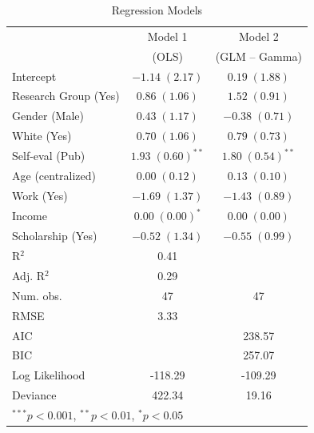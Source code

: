 \documentclass[compress]{beamer}
\begin{document}
\begin{frame}
	\begin{table}
		\centering
		\scriptsize
			\caption{Regression Models}
			\label{linear-coefficients}
		
		\begin{tabular}{l c c }
				\hline
				& Model 1 & Model 2 \\
				& (OLS)   & (GLM -- Gamma) \\
				\hline
				Intercept    & $-1.14 \; (2.17)$     & $0.19 \; (1.88)$      \\
				Research Group (Yes) & $0.86 \; (1.06)$      & $1.52 \; (0.91)$      \\
				Gender (Male)  & $0.43 \; (1.17)$      & $-0.38 \; (0.71)$     \\
				White (Yes)    & $0.70 \; (1.06)$      & $0.79 \; (0.73)$      \\
				Self-eval (Pub)    & $1.93 \; (0.60)^{**}$ & $1.80 \; (0.54)^{**}$ \\
				Age (centralized)     & $0.00 \; (0.12)$      & $0.13 \; (0.10)$      \\
				Work (Yes)  & $-1.69 \; (1.37)$     & $-1.43 \; (0.89)$     \\
				Income     & $0.00 \; (0.00)^{*}$  & $0.00 \; (0.00)$      \\
				Scholarship (Yes) & $-0.52 \; (1.34)$     & $-0.55 \; (0.99)$     \\
				\hline
				R$^2$          & 0.41                  &                       \\
				Adj. R$^2$     & 0.29                  &                       \\
				Num. obs.      & 47                    & 47                    \\
				RMSE           & 3.33                  &                       \\
				AIC            &                       & 238.57                \\
				BIC            &                       & 257.07                \\
				Log Likelihood & -118.29               & -109.29               \\
				Deviance       & 422.34                & 19.16                 \\
				\hline
				\multicolumn{3}{l}{\scriptsize{$^{***}p<0.001$, $^{**}p<0.01$, $^*p<0.05$}}
			\end{tabular}
		\end{table}
\end{frame}
\end{document}
